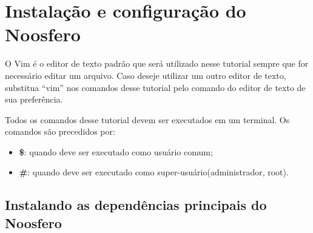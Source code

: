 \lstset{language=sh, numbers=none, breaklines=true}


\chapter{Instalação e configuração do Noosfero }

O Vim é o editor de texto padrão que será utilizado nesse tutorial sempre que for necessário editar um arquivo. Caso deseje utilizar um outro editor de texto, substitua “vim” nos comandos desse tutorial pelo comando do editor de texto de sua preferência.

Todos os comandos desse tutorial devem ser executados em um terminal. Os comandos são precedidos por:

\begin{itemize}
\item \textbf{\$}: quando deve ser executado como usuário comum;
\item \textbf{\#}: quando deve ser executado como super-usuário(administrador, root).
\end{itemize}

\section{Instalando as dependências principais do Noosfero}

